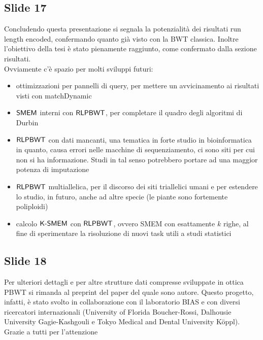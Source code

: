 \documentclass[a4paper,11pt, oneside,italian]{article}
\def\KSMEM{\mbox{\rm {\sf K-SMEM}}}
\def\RLPBWT{\mbox{\rm {\sf RLPBWT}}}
\def\SMEM{\mbox{\rm {\sf SMEM}}}
\begin{document}
\subsection*{Slide 17}
Concludendo questa presentazione si segnala la potenzialità dei risultati run
length encoded, confermando quanto già visto con la BWT classica. Inoltre
l'obiettivo della tesi è stato pienamente raggiunto, come confermato dalla
sezione risultati.\\
Ovviamente c'è spazio per molti sviluppi futuri:
\begin{itemize}
  \item ottimizzazioni per pannelli di query, per mettere un avvicinamento ai
  risultati visti con matchDynamic
  \item $\SMEM$ interni con $\RLPBWT$, per completare il quadro degli algoritmi
  di Durbin
  \item $\RLPBWT$ con dati mancanti, una tematica in forte studio in
  bioinformatica in quanto, causa errori nelle macchine di sequenziamento, ci
  sono siti per cui non si ha informazione. Studi in tal senso potrebbero
  portare ad una maggior potenza di imputazione
  \item $\RLPBWT$ multiallelica, per il discorso dei siti triallelici umani e
  per estendere lo studio, in futuro, anche ad altre specie (le piante sono
  fortemente poliploidi)
  \item calcolo $\KSMEM$ con $\RLPBWT$, ovvero SMEM con esattamente $k$ righe,
  al fine di sperimentare la risoluzione di nuovi task utili a studi statistici
\end{itemize}
\subsection*{Slide 18}
Per ulteriori dettagli e per altre strutture dati compresse sviluppate in ottica
PBWT si rimanda al preprint del paper del quale sono autore.
Questo progetto, infatti, è stato svolto in collaborazione con il laboratorio
BIAS e 
con diversi ricercatori internazionali (University of Florida Boucher-Rossi,
Dalhousie 
University Gagie-Kashgouli e Tokyo Medical and Dental University K\"{o}ppl).\\
Grazie a tutti per l'attenzione
\end{document}
